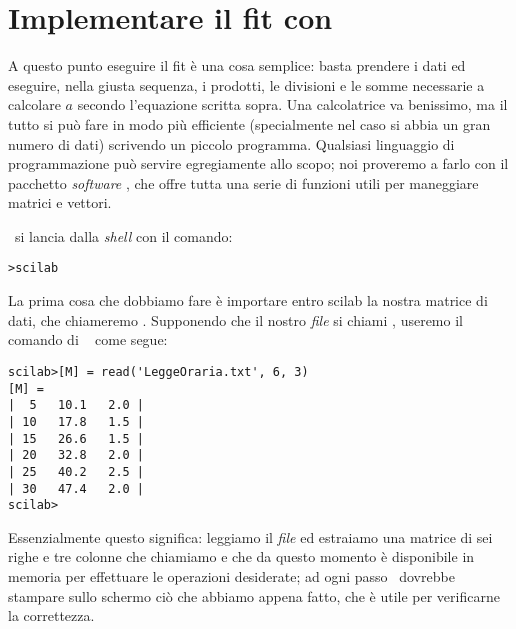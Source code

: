 \section{Implementare il fit con \scilab}

A questo punto eseguire il fit \`e una cosa semplice: basta prendere i dati
ed eseguire, nella giusta sequenza, i prodotti, le divisioni e le somme
necessarie a calcolare $a$ secondo l'equazione scritta sopra.
Una calcolatrice va benissimo, ma il tutto si pu\`o fare in modo pi\`u
efficiente (specialmente nel caso si abbia un gran numero di dati)
scrivendo un piccolo programma.
Qualsiasi linguaggio di programmazione pu\`o servire egregiamente allo scopo;
noi proveremo a farlo con il pacchetto \emph{software} \scilab, che offre
tutta una serie di funzioni utili per maneggiare matrici e vettori.

\scilab\ si lancia dalla \emph{shell} con il comando:
\begin{verbatim}
>scilab
\end{verbatim}
La prima cosa che dobbiamo fare \`e importare entro scilab la nostra matrice
di dati, che chiameremo . Supponendo che il nostro \emph{file} si
chiami , useremo il comando di \scilab\ 
come segue:
\begin{verbatim}
scilab>[M] = read('LeggeOraria.txt', 6, 3)
[M] =
|  5   10.1   2.0 |
| 10   17.8   1.5 |
| 15   26.6   1.5 |
| 20   32.8   2.0 |
| 25   40.2   2.5 |
| 30   47.4   2.0 |
scilab>
\end{verbatim}
Essenzialmente questo significa: leggiamo il \emph{file}
 ed estraiamo una matrice di sei righe e tre colonne
che chiamiamo  e che da questo momento \`e disponibile in memoria
per effettuare le operazioni desiderate; ad ogni passo \scilab\ dovrebbe
stampare sullo schermo ci\`o che abbiamo appena fatto, che \`e utile per
verificarne la correttezza.


